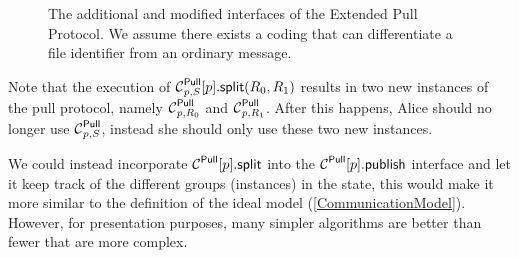 \begin{figure}
  \caption{%
    The additional and modified interfaces of the Extended Pull Protocol.
    We assume there exists a coding that can differentiate a file identifier 
    from an ordinary message.
  }\label{ExtPullFunctions}
\end{figure}

Note that the execution of \(\psplit[p, S]{p}[R_0, R_1]\) results in two new 
instances of the pull protocol, namely \(\Pull[p, R_0]\) and \(\Pull[p, R_1]\).
After this happens, Alice should no longer use \(\Pull[p, S]\), instead she 
should only use these two new instances.

We could instead incorporate \(\psplit{p}\) into the \(\ppub{p}\) interface and 
let it keep track of the different groups (instances) in the state, this would 
make it more similar to the definition of the ideal model 
(\cref{CommunicationModel}).
However, for presentation purposes, many simpler algorithms are better than 
fewer that are more complex.

